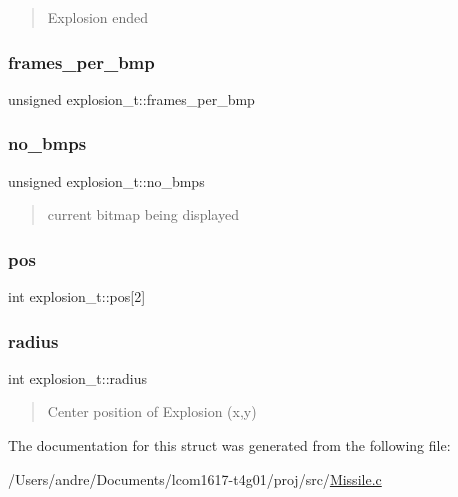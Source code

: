 \begin{quote}
Explosion ended \end{quote}


\hypertarget{structexplosion__t_a2793afa1a8a4c984dd1d3ac5b4cb1eba}{}\label{structexplosion__t_a2793afa1a8a4c984dd1d3ac5b4cb1eba} 
\subsubsection{\texorpdfstring{frames\+\_\+per\+\_\+bmp}{frames\_per\_bmp}}
{\footnotesize\ttfamily unsigned explosion\+\_\+t\+::frames\+\_\+per\+\_\+bmp}

\hypertarget{structexplosion__t_a2f8ea40859d72273c6832774e9c501ed}{}\label{structexplosion__t_a2f8ea40859d72273c6832774e9c501ed} 
\subsubsection{\texorpdfstring{no\+\_\+bmps}{no\_bmps}}
{\footnotesize\ttfamily unsigned explosion\+\_\+t\+::no\+\_\+bmps}



\begin{quote}
current bitmap being displayed \end{quote}


\hypertarget{structexplosion__t_a75cfb98cbaf58d5050310154d9acd899}{}\label{structexplosion__t_a75cfb98cbaf58d5050310154d9acd899} 
\subsubsection{\texorpdfstring{pos}{pos}}
{\footnotesize\ttfamily int explosion\+\_\+t\+::pos\mbox{[}2\mbox{]}}

\hypertarget{structexplosion__t_a1a6cee063c004b26862a9bfefb443d9d}{}\label{structexplosion__t_a1a6cee063c004b26862a9bfefb443d9d} 
\subsubsection{\texorpdfstring{radius}{radius}}
{\footnotesize\ttfamily int explosion\+\_\+t\+::radius}



\begin{quote}
Center position of Explosion (x,y) \end{quote}




The documentation for this struct was generated from the following file\+:\begin{DoxyCompactItemize}
\item 
/\+Users/andre/\+Documents/lcom1617-\/t4g01/proj/src/\hyperlink{_missile_8c}{Missile.\+c}\end{DoxyCompactItemize}
